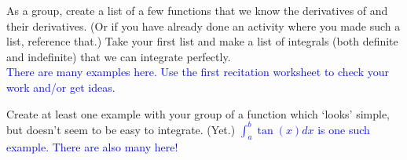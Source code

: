 \documentclass{ximera}
\begin{document}
\begin{exercise}
    As a group, create a list of a few functions that we know the derivatives of and their derivatives.  (Or if you have already done an activity where you made such a list, reference that.)  Take your first list and make a list of integrals (both definite and indefinite) that we can integrate perfectly.\\
    \textcolor{blue}{ There are many examples here. Use the first recitation worksheet to check your work and/or get ideas.}
\end{exercise}

\begin{exercise}
    Create at least one example with your group of a function which `looks' simple, but doesn't seem to be easy to integrate. (Yet.)
    \textcolor{blue}{ $\int_a^b \tan(x)dx$ is one such example. There are also many here! }

\end{exercise}
\end{document}
